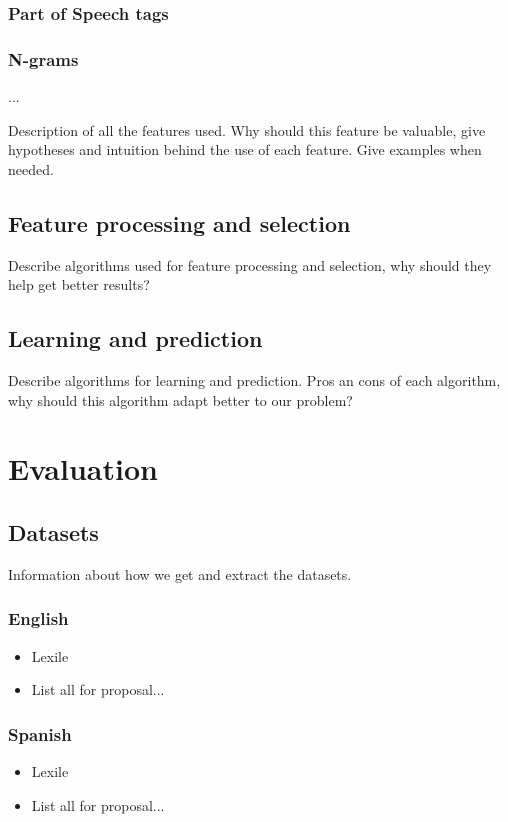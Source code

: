 \documentclass[12pt]{article}
\begin{document}
\subsubsection*{Part of Speech tags}

\subsubsection*{N-grams}

...

Description of all the features used. Why should this feature be valuable, give hypotheses and intuition behind the use of each feature. Give examples when needed.

\subsection{Feature processing and selection}
Describe algorithms used for feature processing and selection, why should they help get better results?

\subsection{Learning and prediction}
Describe algorithms for learning and prediction. Pros an cons of each algorithm, why should this algorithm adapt better to our problem?

\section{Evaluation}

\subsection{Datasets}
Information about how we get and extract the datasets.
\subsubsection{English}
\begin{itemize}
\item Lexile
\item List all for proposal...
\end{itemize}
\subsubsection{Spanish}
\begin{itemize}
\item Lexile
\item List all for proposal...
\end{itemize}
\end{document}
